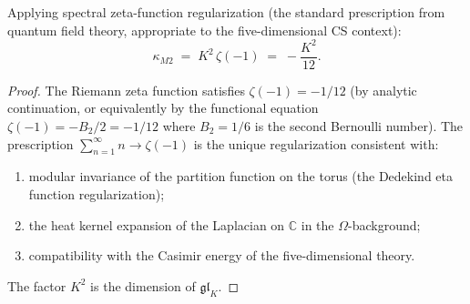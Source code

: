 \documentclass[11pt]{article}
\newcommand{\C}{\mathbb{C}}
\begin{document}
\begin{theorem}
\label{thm:kappa-m2-zeta}
Applying spectral zeta-function regularization
(the standard prescription from quantum field theory,
appropriate to the five-dimensional CS context):
\begin{equation}\label{eq:kappa-m2-regularized}
\boxed{
\kappa_{M2}
\;=\;
K^2\, \zeta(-1)
\;=\;
-\frac{K^2}{12}.
}
\end{equation}
\end{theorem}

\begin{proof}
The Riemann zeta function satisfies $\zeta(-1) = -1/12$
(by analytic continuation, or equivalently by the functional
equation $\zeta(-1) = -B_2/2 = -1/12$ where $B_2 = 1/6$
is the second Bernoulli number).  The prescription
$\sum_{n=1}^\infty n \to \zeta(-1)$ is the unique
regularization consistent with:
\begin{enumerate}[label=(\roman*)]
\item modular invariance of the partition function on the torus
  (the Dedekind eta function regularization);
\item the heat kernel expansion of the Laplacian on $\C$ in the
  $\Omega$-background;
\item compatibility with the Casimir energy of the
  five-dimensional theory.
\end{enumerate}
The factor $K^2$ is the dimension of $\mathfrak{gl}_K$.
\end{proof}
\end{document}
